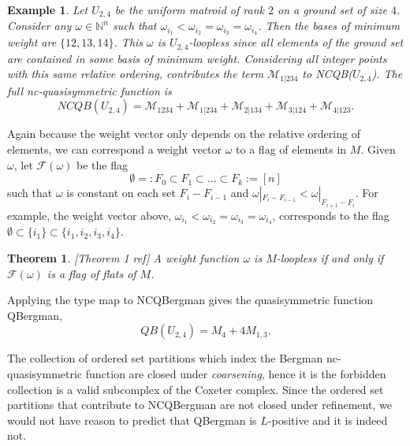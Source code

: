 \documentclass[12pt,reqno]{amsart}
\numberwithin{definition}{section}
\newtheorem{theorem}[definition]{Theorem}
\newtheorem{example}[definition]{Example}
\newcommand{\om}{\omega}
\newcommand{\ncM}{\mathcal{M}}
\begin{document}
\begin{example}

Let $U_{2,4}$ be the uniform matroid of rank $2$ on a ground set of
size $4$.  Consider any $\omega \in \mathbb{N}^n$ such that
$\omega_{i_1} < \omega_{i_2} = \omega_{i_3} = \omega_{i_4}$.  Then the
bases of minimum weight are $\{12, 13, 14\}$.  This $\omega$ is
$U_{2,4}$-loopless since all elements of the ground set are contained
in some basis of minimum weight.  Considering all integer points with this same relative ordering,  contributes the term
${\ncM}_{1|234}$ to NCQB($U_{2,4}$).  The full nc-quasisymmetric function
is
$$NCQB(U_{2,4})  = {\ncM}_{1234} + {\ncM}_{1|234} + {\ncM}_{2|134} + {\ncM}_{3|124} + {\ncM}_{4|123}. $$

\end{example}


Again because the weight vector only depends on the relative ordering
of elements, we can correspond a weight vector $\om$ to a flag of
elements in $M$.  Given $\om$, let $\mathcal{F}(\om)$ be the flag
$$\emptyset =: F_0 \subset F_1 \subset \ldots \subset F_k := [n]$$
such that $\om$ is constant on each set $F_i - F_{i-1}$ and $\om|_{F_i -
  F_{i-1}} < \om|_{F_{i+1} - F_{i}} $.  For example, the weight vector
above, $\om_{i_1} < \om_{i_2} = \om_{i_3} = \om_{i_4}$, corresponds to
the flag ${\emptyset \subset \{i_1\} \subset \{i_1,i_2,i_3,i_4\}}$.

\begin{theorem}\label{thm:Bergman}[Theorem 1 ref]
A weight function $\omega$ is $M$-loopless if and only if $\mathcal{F}(\om)$ is a flag of flats of $M$.
\end{theorem}


Applying the type map to NCQBergman gives the quasisymmetric
function QBergman, 
$$QB(U_{2,4}) = M_4 + 4M_{1,3}.$$


The collection of ordered set partitions which index the Bergman
nc-quasisymmetric function are closed under {\em coarsening}, hence it
is the forbidden collection is a valid subcomplex of the Coxeter
complex.  Since the ordered set partitions that contribute to
NCQBergman are not closed under refinement, we would not have reason
to predict that QBergman is $L$-positive and it is indeed not.
\end{document}
